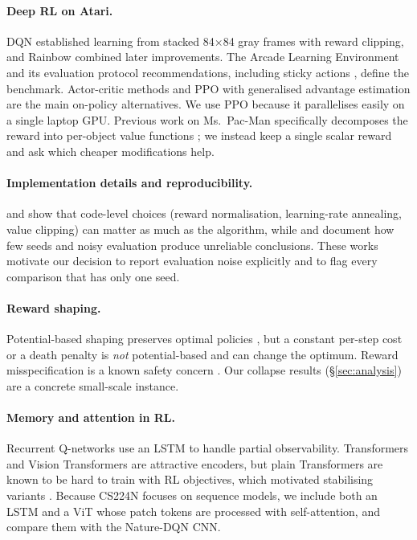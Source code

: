 \documentclass[11pt]{article}
\begin{document}
\paragraph{Deep RL on Atari.} DQN \citep{mnih2013playing,mnih2015dqn} established learning from stacked 84$\times$84 gray frames with reward clipping, and Rainbow \citep{hessel2018rainbow} combined later improvements. The Arcade Learning Environment \citep{bellemare2013ale} and its evaluation protocol recommendations, including sticky actions \citep{machado2018revisiting}, define the benchmark. Actor-critic methods \citep{mnih2016a3c} and PPO \citep{schulman2017ppo} with generalised advantage estimation \citep{schulman2016gae} are the main on-policy alternatives. We use PPO because it parallelises easily on a single laptop GPU. Previous work on Ms.\ Pac-Man specifically decomposes the reward into per-object value functions \citep{vanseijen2017hra}; we instead keep a single scalar reward and ask which cheaper modifications help.

\paragraph{Implementation details and reproducibility.} \citet{engstrom2020implementation} and \citet{huang2022ppo37} show that code-level choices (reward normalisation, learning-rate annealing, value clipping) can matter as much as the algorithm, while \citet{henderson2018matters} and \citet{agarwal2021precipice} document how few seeds and noisy evaluation produce unreliable conclusions. These works motivate our decision to report evaluation noise explicitly and to flag every comparison that has only one seed.

\paragraph{Reward shaping.} Potential-based shaping preserves optimal policies \citep{ng1999shaping}, but a constant per-step cost or a death penalty is \emph{not} potential-based and can change the optimum. Reward misspecification is a known safety concern \citep{amodei2016concrete,skalse2022hacking}. Our collapse results (\S\ref{sec:analysis}) are a concrete small-scale instance.

\paragraph{Memory and attention in RL.} Recurrent Q-networks \citep{hausknecht2015drqn} use an LSTM \citep{hochreiter1997lstm} to handle partial observability. Transformers \citep{vaswani2017attention} and Vision Transformers \citep{dosovitskiy2021vit} are attractive encoders, but plain Transformers are known to be hard to train with RL objectives, which motivated stabilising variants \citep{parisotto2020gtrxl}. Because CS224N focuses on sequence models, we include both an LSTM and a ViT whose patch tokens are processed with self-attention, and compare them with the Nature-DQN CNN.
\end{document}
